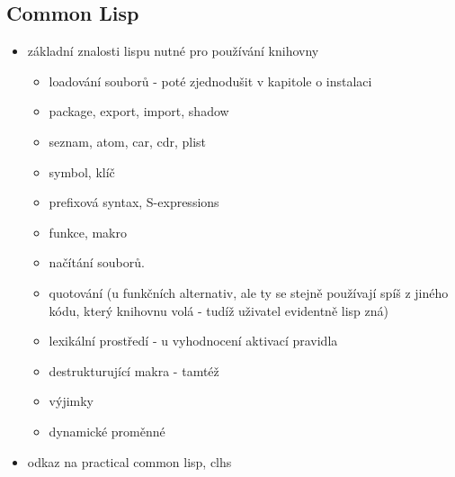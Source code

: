 \subsection{Common Lisp}
\begin{framed}
\begin{itemize}
  \item základní znalosti lispu nutné pro používání knihovny
  \begin{itemize}
    \item loadování souborů - poté zjednodušit v kapitole o instalaci
    \item package, export, import, shadow
    \item seznam, atom, car, cdr, plist
    \item symbol, klíč
    \item prefixová syntax, S-expressions
    \item funkce, makro
    \item načítání souborů.
    \item quotování (u funkčních alternativ, ale ty se stejně používají spíš z jiného
      kódu, který knihovnu volá - tudíž uživatel evidentně lisp zná)
    \item lexikální prostředí - u vyhodnocení aktivací pravidla
    \item destrukturující makra - tamtéž
    \item výjimky
    \item dynamické proměnné
  \end{itemize}
  \item odkaz na practical common lisp, clhs
\end{itemize}
\end{framed}

